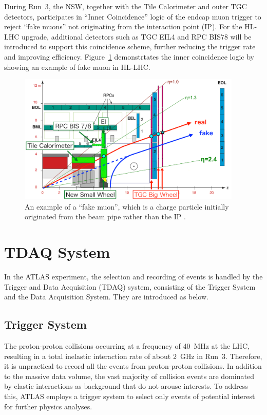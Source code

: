 During Run~3, the NSW, together with the Tile Calorimeter and outer TGC detectors, participates in ``Inner Coincidence'' logic of the endcap muon trigger to reject ``fake muons'' not originating from the interaction point (IP). For the HL-LHC upgrade, additional detectors such as TGC EIL4 and RPC BIS78 will be introduced to support this coincidence scheme, further reducing the trigger rate and improving efficiency. Figure~\ref{fig:InnerCoin} demonstrtates the inner coincidence logic by showing an example of fake muon in HL-LHC.

\begin{figure}[htbp]
  \centering
  \includegraphics[width=0.95\textwidth]{figs/chapter2/InnerCoin_new2.png}
  \caption{An example of a ``fake muon'', which is a charge particle initially originated from the beam pipe rather than the IP \cite{InnerCoinPoster}.}
  \label{fig:InnerCoin}
\end{figure}

\section{TDAQ System} \label{sec:TDAQSystem}
In the ATLAS experiment, the selection and recording of events is handled by the Trigger and Data Acquisition (TDAQ) system, consisting of the Trigger System and the Data Acquisition System. They are introduced as below.
\subsection{Trigger System}
The proton-proton collisions occurring at a frequency of 40~MHz at the LHC, resulting in a total inelastic interaction rate of about 2~GHz in Run~3. Therefore, it is unpractical to record all the events from proton-proton collisions. In addition to the massive data volume, the vast majority of collision events are dominated by elastic interactions as background that do not arouse interests. To address this, ATLAS employs a trigger system to select only events of potential interest for further physics analyses.

